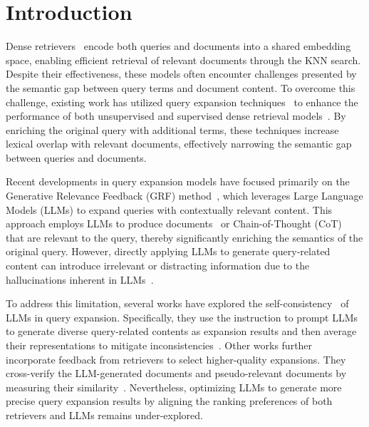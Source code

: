 \section{Introduction}
Dense retrievers~\cite{karpukhin2020dense,xiong2021approximate} encode both queries and documents into a shared embedding space, enabling efficient retrieval of relevant documents through the KNN search. Despite their effectiveness, these models often encounter challenges presented by the semantic gap between query terms and document content. To overcome this challenge, existing work has utilized query expansion techniques~\cite{abdul2004umass, robertson1976relevance} to enhance the performance of both unsupervised and supervised dense retrieval models~\cite{gao2023precise,yu2021improving}. By enriching the original query with additional terms, these techniques increase lexical overlap with relevant documents, effectively narrowing the semantic gap between queries and documents.



Recent developments in query expansion models have focused primarily on the Generative Relevance Feedback (GRF) method~\cite{mackie2023generative, claveau2021neural}, which leverages Large Language Models (LLMs) to expand queries with contextually relevant content. This approach employs LLMs to produce documents~\cite{wang2023query2doc} or Chain-of-Thought (CoT)~\cite{wei2022chain} that are relevant to the query, thereby significantly enriching the semantics of the original query. However, directly applying LLMs to generate query-related content can introduce irrelevant or distracting information due to the hallucinations inherent in LLMs~\cite{ji2023survey, xu2024hallucination}.


To address this limitation, several works have explored the self-consistency~\cite{narangself} of LLMs in query expansion. Specifically, they use the instruction to prompt LLMs to generate diverse query-related contents as expansion results and then average their representations to mitigate inconsistencies~\cite{gao2023precise}. Other works further incorporate feedback from retrievers to select higher-quality expansions. They cross-verify the LLM-generated documents and pseudo-relevant documents by measuring their similarity~\cite{jia2024mill}. Nevertheless, optimizing LLMs to generate more precise query expansion results by aligning the ranking preferences of both retrievers and LLMs remains under-explored.


